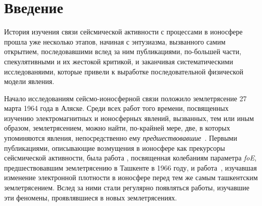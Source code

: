 \documentclass[12pt, oneside, a4paper]{article}
\begin{document}
\section{Введение}
История изучения связи сейсмической активности с процессами в ионосфере прошла уже несколько этапов, начиная с энтузиазма, вызванного самим открытием, последовавшими вслед за ним публикациями, по-большей части, спекулятивными и их жестокой критикой, и заканчивая систематическими исследованяими, которые привели к выработке  последовательной физической модели явления. 

Начало исследованиям сейсмо-ионосферной связи положило землетрясение 27 марта 1964 года в Аляске. Среди всех работ того времени, посвященных изучению электромагнитных и ионосферных явлений, вызванных, тем или иным образом, землетрясением, можно найти, по-крайней мере, две, в которых упоминяются явления, непосредственно ему \emph{предшествовавшие}~\cite{Moore:1964,Davies_Baker:1965}. Первыми публикациями, описывающие возмущения в ионосфере как прекурсоры сейсмической активности, была работа \cite{Antselevich:1971}, посвященная колебаниям параметра \emph{foE}, предшествовавшим землетрясению в Ташкенте в 1966 году, и работа~\cite{Datchenko:1972}, изучавшая изменение электронной плотности в ионосфере перед тем же самым ташкентским землетрясением. Вслед за ними стали регулярно появляться работы, изучавшие эти феномены, проявлявшиеся в новых землетрясениях. 
\end{document}
